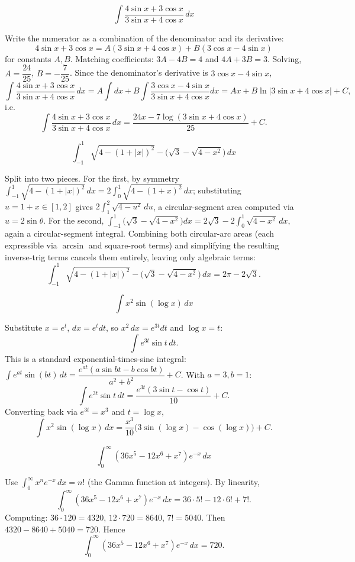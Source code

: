 \begin{questions}
\question \[\int \frac{4\sin x+3\cos x}{3\sin x+4\cos x}\, dx\]
\begin{solution}
Write the numerator as a combination of the denominator and its derivative:
\[
4\sin x+3\cos x = A(3\sin x+4\cos x)+B(3\cos x-4\sin x)
\]
for constants $A,B$. Matching coefficients: $3A-4B=4$ and $4A+3B=3$. Solving, $A=\dfrac{24}{25}$, $B=-\dfrac{7}{25}$. Since the denominator's derivative is $3\cos x-4\sin x$,
\[
\int \frac{4\sin x+3\cos x}{3\sin x+4\cos x}\, dx = A\int dx + B\int \frac{3\cos x-4\sin x}{3\sin x+4\cos x}dx = Ax+B\ln|3\sin x+4\cos x|+C,
\]
i.e.
\[
\int \frac{4\sin x+3\cos x}{3\sin x+4\cos x}\, dx = \frac{24x-7\log(3\sin x+4\cos x)}{25}+C.
\]
\end{solution}

\question \[\int_{-1}^{1} \sqrt{4-(1+|x|)^2}-\Big(\sqrt3-\sqrt{4-x^2}\Big)\, dx\]
\begin{solution}
Split into two pieces. For the first, by symmetry $\int_{-1}^1\sqrt{4-(1+|x|)^2}\,dx=2\int_0^1\sqrt{4-(1+x)^2}\,dx$; substituting $u=1+x\in[1,2]$ gives $2\int_1^2\sqrt{4-u^2}\,du$, a circular-segment area computed via $u=2\sin\theta$. For the second, $\int_{-1}^1\big(\sqrt3-\sqrt{4-x^2}\big)dx=2\sqrt3-2\int_0^1\sqrt{4-x^2}\,dx$, again a circular-segment integral. Combining both circular-arc areas (each expressible via $\arcsin$ and square-root terms) and simplifying the resulting inverse-trig terms cancels them entirely, leaving only algebraic terms:
\[
\int_{-1}^{1} \sqrt{4-(1+|x|)^2}-\Big(\sqrt3-\sqrt{4-x^2}\Big)\, dx = 2\pi - 2\sqrt3.
\]
\end{solution}

\question \[\int x^2\sin(\log x)\, dx\]
\begin{solution}
Substitute $x=e^t$, $dx=e^t dt$, so $x^2\,dx=e^{3t}dt$ and $\log x = t$:
\[
\int e^{3t}\sin t\, dt.
\]
This is a standard exponential-times-sine integral: $\int e^{at}\sin(bt)\,dt = \dfrac{e^{at}(a\sin bt - b\cos bt)}{a^2+b^2}+C$. With $a=3,b=1$:
\[
\int e^{3t}\sin t\,dt = \frac{e^{3t}(3\sin t-\cos t)}{10}+C.
\]
Converting back via $e^{3t}=x^3$ and $t=\log x$,
\[
\int x^2\sin(\log x)\, dx = \frac{x^3}{10}\big(3\sin(\log x)-\cos(\log x)\big)+C.
\]
\end{solution}

\question \[\int_0^{\infty} (36x^5-12x^6+x^7)e^{-x}\, dx\]
\begin{solution}
Use $\int_0^\infty x^n e^{-x}\,dx = n!$ (the Gamma function at integers). By linearity,
\[
\int_0^\infty (36x^5-12x^6+x^7)e^{-x}\,dx = 36\cdot5!-12\cdot6!+7!.
\]
Computing: $36\cdot120=4320$, $12\cdot720=8640$, $7!=5040$. Then $4320-8640+5040=720$. Hence
\[
\int_0^{\infty} (36x^5-12x^6+x^7)e^{-x}\, dx = 720.
\]
\end{solution}

\end{questions}

